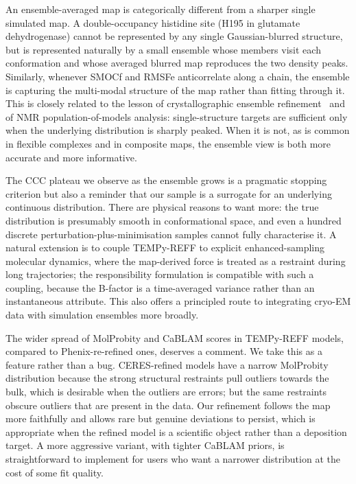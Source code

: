 \documentclass[11pt]{article}
\begin{document}
An ensemble-averaged map is categorically different from a sharper single simulated map. A double-occupancy histidine site (H195 in glutamate dehydrogenase) cannot be represented by any single Gaussian-blurred structure, but is represented naturally by a small ensemble whose members visit each conformation and whose averaged blurred map reproduces the two density peaks. Similarly, whenever SMOCf and RMSFe anticorrelate along a chain, the ensemble is capturing the multi-modal structure of the map rather than fitting through it. This is closely related to the lesson of crystallographic ensemble refinement~\cite{burnley2012,levin2007} and of NMR population-of-models analysis: single-structure targets are sufficient only when the underlying distribution is sharply peaked. When it is not, as is common in flexible complexes and in composite maps, the ensemble view is both more accurate and more informative.

The CCC plateau we observe as the ensemble grows is a pragmatic stopping criterion but also a reminder that our sample is a surrogate for an underlying continuous distribution. There are physical reasons to want more: the true distribution is presumably smooth in conformational space, and even a hundred discrete perturbation-plus-minimisation samples cannot fully characterise it. A natural extension is to couple TEMPy-REFF to explicit enhanced-sampling molecular dynamics, where the map-derived force is treated as a restraint during long trajectories; the responsibility formulation is compatible with such a coupling, because the B-factor is a time-averaged variance rather than an instantaneous attribute. This also offers a principled route to integrating cryo-EM data with simulation ensembles more broadly.

The wider spread of MolProbity and CaBLAM scores in TEMPy-REFF models, compared to Phenix-re-refined ones, deserves a comment. We take this as a feature rather than a bug. CERES-refined models have a narrow MolProbity distribution because the strong structural restraints pull outliers towards the bulk, which is desirable when the outliers are errors; but the same restraints obscure outliers that are present in the data. Our refinement follows the map more faithfully and allows rare but genuine deviations to persist, which is appropriate when the refined model is a scientific object rather than a deposition target. A more aggressive variant, with tighter CaBLAM priors, is straightforward to implement for users who want a narrower distribution at the cost of some fit quality.
\end{document}
